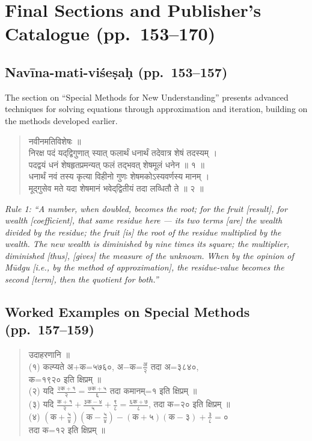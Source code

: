 \documentclass[11pt,a4paper]{article}
\newcommand{\cnote}[1]{\textcolor{notecolor}{\textit{#1}}}
\newcommand{\dev}[1]{{\devanagarifont #1}}
\newenvironment{sanskritverse}{%
  \begin{verse}
}{%
  \end{verse}
}
\begin{document}
\section{Final Sections and Publisher's Catalogue (pp.\ 153--170)}
\label{sec:final}

\subsection{Navīna-mati-viśeṣaḥ (pp.\ 153--157)}

The section on ``Special Methods for New Understanding'' presents advanced techniques for solving equations through approximation and iteration, building on the methods developed earlier.

\begin{sanskritverse}
\dev{%
नवीनमतिविशेषः ॥\\[0.5em]
निरक्ष पदं यद्‌द्विगुणात् स्यात् फलार्थं धनार्थं तदेवात्र शेषं तदस्यम् ।\\
पदद्वयं धनं शेषहृतप्रमन्यत् फलं तद्‌भवत् शेषमूलं धनेन ॥ १ ॥\\
धनार्थं नवं तस्य कृत्या विहीनो गुणः शेषमकोऽस्यवर्णस्य मानम् ।\\
मूद्‌गुसेव मते यदा शेषमानं भवेद्‌द्वितीयं तदा लव्धितौ ते ॥ २ ॥}
\end{sanskritverse}

\cnote{Rule 1: ``A number, when doubled, becomes the root; for the fruit [result], for wealth [coefficient], that same residue here --- its two terms [are] the wealth divided by the residue; the fruit [is] the root of the residue multiplied by the wealth. The new wealth is diminished by nine times its square; the multiplier, diminished [thus], [gives] the measure of the unknown. When by the opinion of Mūdgu [i.e., by the method of approximation], the residue-value becomes the second [term], then the quotient for both.''}

\subsection{Worked Examples on Special Methods (pp.\ 157--159)}

\begin{sanskritverse}
\dev{%
उदाहरणानि ॥\\[0.3em]
(१) कल्प्यते अ+क=५७६०, अ$-$क=$\frac{\text{अ}}{२}$ तदा अ=३८४०,\\
\hspace*{2em} क=१९२० इति क्षिप्रम् ॥\\[0.3em]
(२) यदि $\frac{२\text{क}+१}{२} = \frac{७\text{क}+५}{६}$ तदा कमानम्=१ इति क्षिप्रम् ॥\\[0.3em]
(३) यदि $\frac{\text{क}+१}{२} + \frac{३\text{क}-४}{५} + \frac{९}{८} = \frac{६\text{क}+७}{८}$, तदा क=२० इति क्षिप्रम् ॥\\[0.3em]
(४) $(\text{क}+\frac{५}{४})(\text{क}-\frac{५}{४}) - (\text{क}+५)(\text{क}-३) + \frac{३}{८} = ०$\\
\hspace*{2em} तदा क=१२ इति क्षिप्रम् ॥}
\end{sanskritverse}
\end{document}
